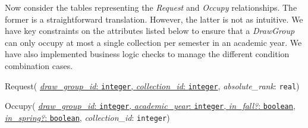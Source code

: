 Now consider the tables representing the \emph{Request} and \emph{Occupy}
relationships. The former is a straightforward translation. However, the latter is
not as intuitive. We have key constraints on the attributes listed below to ensure
that a \emph{DrawGroup} can only occupy at most a single collection per semester
in an academic year. We have also implemented business logic checks to manage
the different condition combination cases.

\begin{description}
  \item Request(
        \ul{\emph{draw\_group\_id}: \texttt{integer},
        \emph{collection\_id}: \texttt{integer}},
        \emph{absolute\_rank}: \texttt{real})

  \item Occupy(
        \ul{\emph{draw\_group\_id}: \texttt{integer},
        \emph{academic\_year}: \texttt{integer},
        \emph{in\_fall?}: \texttt{boolean},
        \emph{in\_spring?}: \texttt{boolean}},
        \emph{collection\_id}: \texttt{integer})   
     
\end{description}



